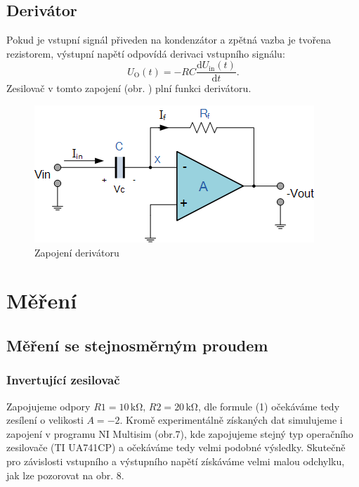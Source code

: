 \documentclass[czech,11pt,a4paper]{article}
\begin{document}
\begin{multicols}{2}
		\subsection{Derivátor}
		
		Pokud je vstupní signál přiveden na kondenzátor a zpětná vazba je tvořena rezistorem, výstupní napětí odpovídá derivaci vstupního signálu:
		\begin{equation}
			U_\mathrm{O}(t) = -RC \frac{\mathrm{d}U_\mathrm{in}(t)}{\mathrm{d}t}.
		\end{equation}
		Zesilovač v tomto zapojení (obr. ) plní funkci derivátoru.
		\begin{figure}[H]
			\centering
			\includegraphics[width=0.8\linewidth]{der}
			\caption{Zapojení derivátoru}
		\end{figure}
		
		
		
		\section{Měření}
		\subsection{Měření se stejnosměrným proudem}
		
		\subsubsection{Invertující zesilovač}
		Zapojujeme odpory $R1 = 10\,\mathrm{k\Omega},\, R2 = 20 \,\mathrm{k\Omega}$, dle formule (1) očekáváme tedy zesílení o velikosti $A = -2$. Kromě experimentálně získaných dat simulujeme i zapojení v programu NI Multisim (obr.7), kde zapojujeme stejný typ operačního zesilovače (TI UA741CP) a očekáváme tedy velmi podobné výsledky. Skutečně pro závislosti vstupního a výstupního napětí získáváme velmi malou odchylku, jak lze pozorovat na obr. 8.
		
		\begin{figure}[H]
			\centering
			

\end{figure}
\end{multicols}
\end{document}
